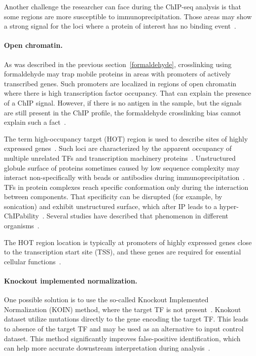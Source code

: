 Another challenge the researcher can face during the ChIP-seq analysis is that some regions are more susceptible to immunoprecipitation. 
Those areas may show a strong signal for the loci where a protein of interest has no binding event~\cite{teytelman2013highly}.

\paragraph{Open chromatin.}
As was described in the previous section~\ref{formaldehyde}, crosslinking using formaldehyde may trap mobile proteins in areas with promoters of actively transcribed genes. 
Such promoters are localized in regions of open chromatin where there is high transcription factor occupancy.  
That can explain the presence of a ChIP signal. 
However, if there is no antigen in the sample, but the signals are still present in the ChIP profile, the formaldehyde crosslinking bias cannot explain such a fact~\cite{jain2015active}.

The term high-occupancy target (HOT) region is used to describe sites of highly expressed genes~\cite{teytelman2013highly}.  
Such loci are characterized by the  apparent occupancy of multiple unrelated TFs and transcription machinery proteins~\cite{boyle2014comparative}. 
Unstructured globule surface of proteins sometimes caused by low sequence complexity may interact non-specifically with beads or antibodies during immunoprecipitation~\cite{teytelman2013highly}.
TFs in protein complexes reach specific conformation only during the interaction between components. 
That specificity can be disrupted (for example, by sonication) and exhibit unstructured surface, which after IP leads to a hyper-ChIPability~\cite{jain2015active}.
Several studies have described that phenomenon in different organisms~\cite{boyle2014comparative, fan2009does, krebs2014optimization, teytelman2013highly,   waldminghaus2010chip, xie2013dynamic}.

The HOT region location is typically at promoters of highly expressed genes close to the transcription start site (TSS), and these genes are required for essential cellular functions~\cite{wreczycka2019hot}. 

\paragraph{Knockout implemented normalization.}
One possible solution is to use the so-called Knockout Implemented Normalization (KOIN) method, where the target TF is not present~\cite{krebs2014optimization}.
Knokout dataset utilize mutations directly to the gene encoding the target TF.
This leads to absence of the target TF and may be used as an alternative to input control dataset.
This method significantly improves false-positive identification, which can help more accurate downstream interpretation during analysis~\cite{wreczycka2019hot}.

